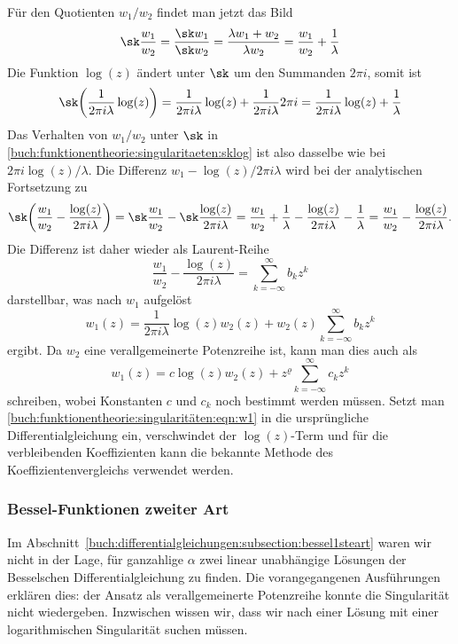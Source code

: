 Für den Quotienten $w_1/w_2$ findet man jetzt das Bild
\begin{equation}
\sk \frac{w_1}{w_2}
=
\frac{\sk w_1}{\sk w_2}
=
\frac{\lambda w_1+w_2}{\lambda w_2}
=
\frac{w_1}{w_2} + \frac{1}{\lambda}
\label{buch:funktionentheorie:singularitaeten:sklog}
\end{equation}
Die Funktion $\log(z)$ ändert unter $\sk$ um den Summanden
$2\pi i$, somit ist
\[
\sk\biggl(
\frac{1}{2\pi i\lambda}
\log(z)
\biggr)
=
\frac{1}{2\pi i\lambda}
\log(z)
+
\frac{1}{2\pi i\lambda}
2\pi i
=
\frac{1}{2\pi i\lambda}
\log(z)
+
\frac{1}{\lambda}
\]
Das Verhalten von $w_1/w_2$ unter $\sk$ in
\eqref{buch:funktionentheorie:singularitaeten:sklog}
ist also dasselbe wie bei $2\pi i\log(z)/\lambda$.
Die Differenz $w_1-\log(z)/{2\pi i\lambda}$ wird bei der analytischen
Fortsetzung zu
\[
\sk\biggl(
\frac{w_1}{w_2}-\frac{\log(z)}{2\pi i\lambda}
\biggr)
=
\sk \frac{w_1}{w_2} - \sk\frac{\log(z)}{2\pi i\lambda}
=
\frac{w_1}{w_2} + \frac{1}{\lambda}
-
\frac{\log(z)}{2\pi i\lambda}
-\frac{1}{\lambda}
=
\frac{w_1}{w_2}-\frac{\log(z)}{2\pi i\lambda}.
\]
Die Differenz ist daher wieder als Laurent-Reihe
\[
\frac{w_1}{w_2}-\frac{\log(z)}{2\pi i\lambda}
=
\sum_{k=-\infty}^\infty b_kz^k
\]
darstellbar, was nach $w_1$ aufgelöst 
\[
w_1(z)
=
\frac{1}{2\pi i\lambda} \log(z) w_2(z)
+
w_2(z) \sum_{k=-\infty}^\infty b_kz^k
\]
ergibt.
Da $w_2$ eine verallgemeinerte Potenzreihe ist, kann man dies auch
als
\begin{equation}
w_1(z)
=
c \log(z) w_2(z)
+
z^{\varrho}
\sum_{k=-\infty}^{\infty} c_kz^k
\label{buch:funktionentheorie:singularitäten:eqn:w1}
\end{equation}
schreiben, wobei Konstanten $c$ und $c_k$ noch bestimmt werden müssen.
Setzt man
\eqref{buch:funktionentheorie:singularitäten:eqn:w1}
in die ursprüngliche Differentialgleichung ein, verschwindet der
$\log(z)$-Term und für die verbleibenden Koeffizienten kann die
bekannte Methode des Koeffizientenvergleichs verwendet werden.

%
%
\subsubsection{Bessel-Funktionen zweiter Art
\label{buch:funktionentheorie:subsubsection:bessel2art}}
Im Abschnitt~\ref{buch:differentialgleichungen:subsection:bessel1steart}
waren wir nicht in der Lage, für ganzahlige $\alpha$ zwei linear unabhängige
Lösungen der Besselschen Differentialgleichung zu finden.
Die vorangegangenen Ausführungen erklären dies: der Ansatz als
verallgemeinerte Potenzreihe konnte die Singularität nicht wiedergeben.
Inzwischen wissen wir, dass wir nach einer Lösung mit einer logarithmischen
Singularität suchen müssen.

